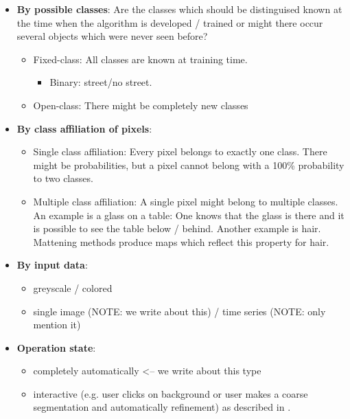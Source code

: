 \begin{itemize}
    \item \textbf{By possible classes}: Are the classes which should be distinguised
          known at the time when the algorithm is developed / trained or might
          there occur several objects which were never seen before?
          \begin{itemize}
              \item Fixed-class: All classes are known at training time.
              \begin{itemize}
                  \item Binary: street/no street.
              \end{itemize}
              \item Open-class: There might be completely new classes
          \end{itemize}
    \item \textbf{By class affiliation of pixels}:
        \begin{itemize}
            \item Single class affiliation: Every pixel belongs to exactly one class. There might
                  be probabilities, but a pixel cannot belong with a 100\%
                  probability to two classes.
            \item Multiple class affiliation: A single pixel might belong to
                  multiple classes. An example is a glass on a table: One
                  knows that the glass is there and it is possible to see the
                  table below / behind. Another example is hair. Mattening
                  methods produce maps which reflect this property for hair.\cite{levin2008spectral}
        \end{itemize}
    \item \textbf{By input data}:
          \begin{itemize}
              \item greyscale / colored
              \item single image (NOTE: we write about this) / time series (NOTE: only mention it)
          \end{itemize}
    \item \textbf{Operation state}:
        \begin{itemize}
            \item completely automatically <-- we write about this type
            \item interactive (e.g. user clicks on background or user makes a
                  coarse segmentation and automatically refinement) as
                  described in
                  \cite{protiere2007interactive,rother2004grabcut}.
        \end{itemize}
\end{itemize}

